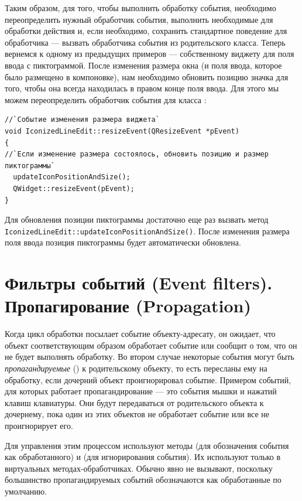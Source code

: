 Таким образом, для того, чтобы выполнить обработку события, необходимо переопределить нужный обработчик события,
выполнить необходимые для обработки действия и, если необходимо, сохранить стандартное поведение для обработчика ---
вызвать обработчика события из родительского класса. Теперь вернемся к одному из предыдущих примеров --- собственному
виджету для поля ввода с пиктограммой. После изменения размера окна (и поля ввода, которое было размещено в
компоновке), нам необходимо обновить позицию значка для того, чтобы она всегда находилась в правом конце поля ввода.
Для этого мы можем переопределить обработчик события  для класса :
\begin{lstlisting}
//`Событие изменения размера виджета`
void IconizedLineEdit::resizeEvent(QResizeEvent *pEvent)
{
//`Если изменение размера состоялось, обновить позицию и размер пиктограммы`
  updateIconPositionAndSize();
  QWidget::resizeEvent(pEvent);
}
\end{lstlisting}

Для обновления позиции пиктограммы достаточно еще раз вызвать метод
\lstinline!IconizedLineEdit::updateIconPositionAndSize()!. После изменения размера поля ввода позиция пиктограммы будет
автоматически обновлена.

\section[Фильтры событий (Event filters). Пропагирование (Propagation)]{Фильтры событий (Event filters). Пропагирование (Propagation)}
Когда цикл обработки посылает событие объекту-адресату, он ожидает, что объект соответствующим образом обработает
событие или сообщит о том, что он не будет выполнять обработку. Во втором случае некоторые события могут быть
\emph{пропагандируемые} () к родительскому объекту, то есть пересланы ему на
обработку, если дочерний объект проигнорировал событие. Примером событий, для которых работает пропагандирование --- это
события мышки и нажатий клавиш клавиатуры. Они будут передаваться от родительского объекта к дочернему, пока один из
этих объектов не обработает событие или все не проигнорирует его. 

Для управления этим процессом используют методы 
(для обозначения события как обработанного) и  (для игнорирования события). Их
используют только в виртуальных методах-обработчиках. Обычно  явно не вызывают,
поскольку большинство пропагандируемых событий обозначаются как обработанные по умолчанию.

